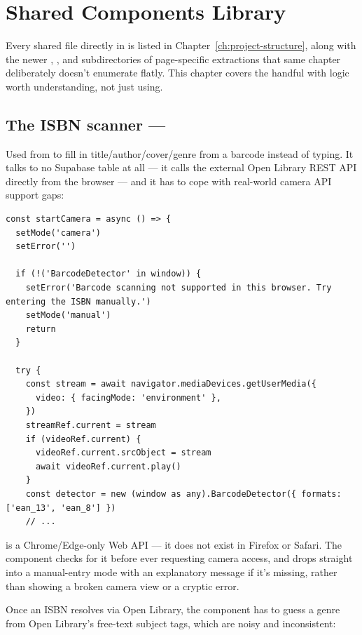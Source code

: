 \chapter{Shared Components Library}
\label{ch:components}

Every shared file directly in  is listed in Chapter~\ref{ch:project-structure}, along with the newer , , and  subdirectories of page-specific extractions that same chapter deliberately doesn't enumerate flatly. This chapter covers the handful with logic worth understanding, not just using.

\section{The ISBN scanner — }

Used from  to fill in title/author/cover/genre from a barcode instead of typing. It talks to no Supabase table at all — it calls the external Open Library REST API directly from the browser — and it has to cope with real-world camera API support gaps:

\begin{lstlisting}[caption={Feature-detecting the camera barcode API, with a graceful fallback}]
const startCamera = async () => {
  setMode('camera')
  setError('')

  if (!('BarcodeDetector' in window)) {
    setError('Barcode scanning not supported in this browser. Try entering the ISBN manually.')
    setMode('manual')
    return
  }

  try {
    const stream = await navigator.mediaDevices.getUserMedia({
      video: { facingMode: 'environment' },
    })
    streamRef.current = stream
    if (videoRef.current) {
      videoRef.current.srcObject = stream
      await videoRef.current.play()
    }
    const detector = new (window as any).BarcodeDetector({ formats: ['ean_13', 'ean_8'] })
    // ...
\end{lstlisting}

 is a Chrome/Edge-only Web API — it does not exist in Firefox or Safari. The component checks for it before ever requesting camera access, and drops straight into a manual-entry mode with an explanatory message if it's missing, rather than showing a broken camera view or a cryptic error.

Once an ISBN resolves via Open Library, the component has to guess a genre from Open Library's free-text subject tags, which are noisy and inconsistent:

